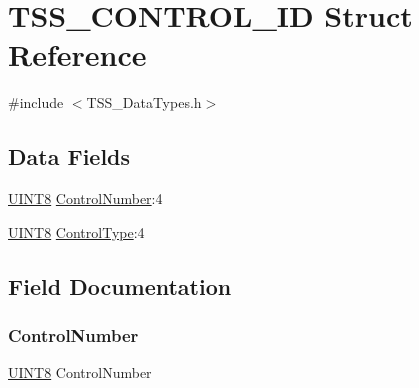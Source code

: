 \hypertarget{struct_t_s_s___c_o_n_t_r_o_l___i_d}{}\section{T\+S\+S\+\_\+\+C\+O\+N\+T\+R\+O\+L\+\_\+\+ID Struct Reference}
\label{struct_t_s_s___c_o_n_t_r_o_l___i_d}


{\ttfamily \#include $<$T\+S\+S\+\_\+\+Data\+Types.\+h$>$}

\subsection*{Data Fields}
\begin{DoxyCompactItemize}
\item 
\hyperlink{_t_s_s___data_types_8h_ab27e9918b538ce9d8ca692479b375b6a}{U\+I\+N\+T8} \hyperlink{struct_t_s_s___c_o_n_t_r_o_l___i_d_aebea8db6e14b5e3d70d765ae77576bfe}{Control\+Number}\+:4
\item 
\hyperlink{_t_s_s___data_types_8h_ab27e9918b538ce9d8ca692479b375b6a}{U\+I\+N\+T8} \hyperlink{struct_t_s_s___c_o_n_t_r_o_l___i_d_a1de548dce28affc9c7405aac27a7d88f}{Control\+Type}\+:4
\end{DoxyCompactItemize}


\subsection{Field Documentation}
\mbox{\label{struct_t_s_s___c_o_n_t_r_o_l___i_d_aebea8db6e14b5e3d70d765ae77576bfe}} 
\subsubsection{\texorpdfstring{Control\+Number}{ControlNumber}}
{\footnotesize\ttfamily \hyperlink{_t_s_s___data_types_8h_ab27e9918b538ce9d8ca692479b375b6a}{U\+I\+N\+T8} Control\+Number}

\mbox{\label{struct_t_s_s___c_o_n_t_r_o_l___i_d_a1de548dce28affc9c7405aac27a7d88f}} 
